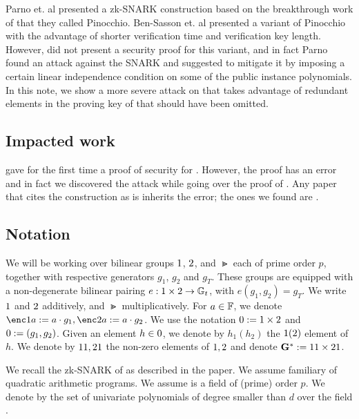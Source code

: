 \documentclass[11pt]{article}
\numberwithin{equation}{section} %
\numberwithin{figure}{section} %
\begin{document}
Parno et. al \cite{PGHR} presented a zk-SNARK construction based on the breakthrough work of \cite{GGPR} that they called Pinocchio.
Ben-Sasson et. al \cite{BCTV} presented a variant of Pinocchio with the advantage of shorter verification time and verification key length. However, \cite{BCTV} did not present a security proof for this variant, and in fact Parno \cite{Parno15} found an attack against the \cite{BCTV} SNARK and suggested to mitigate it by imposing a certain linear independence condition on some of the public instance polynomials. In this note, we show a more severe attack on \cite{BCTV} that takes advantage of redundant elements in the proving key of \cite{BCTV} that should have been omitted.


\subsection{Impacted work}
\cite{BGG} gave for the first time a proof of security for \cite{BCTV}. However, the proof has an error and in fact we discovered the attack while going over the proof of \cite{BGG}.
Any paper that cites the \cite{BCTV} construction as is inherits the error; the ones we found are \cite{Adsnark,Fuchsbauer18}.
% 



\subsection{Notation}
We will be working over bilinear groups $\G1$, $\G2$, and $\Gt$ each of prime order $p$, together with respective generators $g_1$, $g_2$ and $g_T$.
These groups are equipped with a non-degenerate bilinear pairing $e:\G1 \times \G2 \to \Gt$, with $e(g_1, g_2) = g_T$.
We write $\G1$ and $\G2$ additively, and $\Gt$ multiplicatively.
For $a \in \mathbb F$, we denote $\enc1{a}\defeq a\cdot g_1, \enc2{a}\defeq a\cdot g_2$.
We use the notation $\G0\defeq \G1\times \G2$ and $\g0\defeq (g_1,g_2)$.
Given an element $h \in \G0$, we denote by $h_1 (h_2)$ the $\G1 (\G2)$ element of $h$.
We denote by $\G11,\G21$ the non-zero elements of $\G1,\G2$ and denote $\GG \defeq \G11\times \G21$.

We recall the zk-SNARK of \cite{BCTV} as described in the paper.
We assume familiary of quadratic arithmetic programs.
We assume \F is a field of (prime) order $p$.
We denote by  the set of univariate polynomials of degree smaller than $d$ over the field \F.
\end{document}
